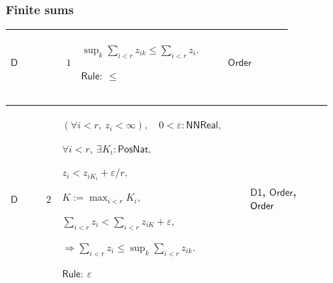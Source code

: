 \documentclass[12pt,reqno]{amsart}
\theoremstyle{blueplain}
\numberwithin{equation}{section}
\newlength{\DCTOneColumnBody}
\begin{document}
\subsubsection{\protect\scriptsize Finite sums}

{\scriptsize \setlength{\parskip}{0pt}\nointerlineskip
\noindent 
\begin{tabular}{|@{}>{\centering\arraybackslash}m{\DCTOneColumnBody}|}
\hline
$\displaystyle \mathsf{Context\_D}:=$\par$\displaystyle r:\mathsf{PosNat}%
,\quad z:\mathsf{Fin}(r)\to\mathsf{PosNat}\to\mathsf{E},$\par$\displaystyle %
\forall i:\mathsf{Fin}(r),\ z_{ik}\uparrow z_i.$ \\ \hline
\end{tabular}%
}

{\scriptsize \setlength{\parskip}{0pt}\nointerlineskip
\noindent 
\begin{tabular}{|@{}>{\centering\arraybackslash}m{0.10658\linewidth}|>{\centering\arraybackslash}m{0.03553\linewidth}|>{\centering\arraybackslash}m{0.52105\linewidth}|>{\centering\arraybackslash}m{0.23684\linewidth}|}
\hline
\hypertarget{proof:D1}{$\displaystyle \mathsf{D}$} & $\displaystyle 1$ & $%
\displaystyle \sup_k\sum_{i<r}z_{ik}\le\sum_{i<r}z_i.$\par$\displaystyle 
\mathsf{Rule}:\ \le$ & \hyperlink{ax:Order}{$\displaystyle \mathsf{Order}$}
\\ \hline
\end{tabular}%
}

{\scriptsize \setlength{\parskip}{0pt}\nointerlineskip
\noindent 
\begin{tabular}{|@{}>{\centering\arraybackslash}m{0.10658\linewidth}|>{\centering\arraybackslash}m{0.03553\linewidth}|>{\centering\arraybackslash}m{0.52105\linewidth}|>{\centering\arraybackslash}m{0.23684\linewidth}|}
\hline
\hypertarget{proof:D2}{$\displaystyle \mathsf{D}$} & $\displaystyle 2$ & $%
\displaystyle (\forall i<r,\ z_i<\infty),\quad0<\varepsilon:\mathsf{NNReal},$%
\par$\displaystyle \forall i<r,\ \exists K_i:\mathsf{PosNat},$\par$%
\displaystyle z_i<z_{iK_i}+\varepsilon/r,$\par$\displaystyle %
K:=\max_{i<r}K_i,$\par$\displaystyle \sum_{i<r}z_i<\sum_{i<r}z_{iK}+%
\varepsilon,$\par$\displaystyle \Rightarrow\sum_{i<r}z_i\le\sup_k%
\sum_{i<r}z_{ik}.$\par$\displaystyle \mathsf{Rule}:\ \varepsilon$ & 
\hyperlink{proof:D1}{$\displaystyle \mathsf{D1}$}, \hyperlink{lem:Order}{$%
\displaystyle \mathsf{Order}$}, \hyperlink{ax:Order}{$\displaystyle \mathsf{%
Order}$} \\ \hline
\end{tabular}%
}
\end{document}
